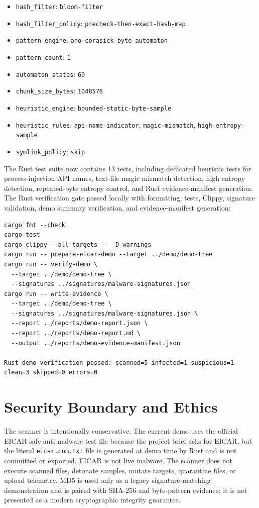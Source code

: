 \documentclass[11pt]{article}
\begin{document}
\begin{itemize}[leftmargin=*]
  \item \texttt{hash\_filter}: \texttt{bloom-filter}
  \item \texttt{hash\_filter\_policy}: \texttt{precheck-then-exact-hash-map}
  \item \texttt{pattern\_engine}: \texttt{aho-corasick-byte-automaton}
  \item \texttt{pattern\_count}: \texttt{1}
  \item \texttt{automaton\_states}: \texttt{69}
  \item \texttt{chunk\_size\_bytes}: \texttt{1048576}
  \item \texttt{heuristic\_engine}: \texttt{bounded-static-byte-sample}
  \item \texttt{heuristic\_rules}: \texttt{api-name-indicator},
        \texttt{magic-mismatch}, \texttt{high-entropy-sample}
  \item \texttt{symlink\_policy}: \texttt{skip}
\end{itemize}

The Rust test suite now contains 13 tests, including dedicated heuristic tests
for process-injection API names, text-file magic mismatch detection, high
entropy detection, repeated-byte entropy control, and Rust evidence-manifest
generation. The Rust verification gate passed locally with formatting, tests,
Clippy, signature validation, demo summary verification, and evidence-manifest
generation:

\begin{lstlisting}[style=sentinel]
cargo fmt --check
cargo test
cargo clippy --all-targets -- -D warnings
cargo run -- prepare-eicar-demo --target ../demo/demo-tree
cargo run -- verify-demo \
  --target ../demo/demo-tree \
  --signatures ../signatures/malware-signatures.json
cargo run -- write-evidence \
  --target ../demo/demo-tree \
  --signatures ../signatures/malware-signatures.json \
  --report ../reports/demo-report.json \
  --report ../reports/demo-report.md \
  --output ../reports/demo-evidence-manifest.json

Rust demo verification passed: scanned=5 infected=1 suspicious=1 clean=3 skipped=0 errors=0
\end{lstlisting}

\section{Security Boundary and Ethics}

The scanner is intentionally conservative. The current demo uses the official
EICAR safe anti-malware test file because the project brief asks for EICAR, but
the literal \texttt{eicar.com.txt} file is generated at demo time by Rust and is
not committed or exported. EICAR is not live malware. The scanner does not
execute scanned files, detonate samples, mutate targets, quarantine files, or
upload telemetry. MD5 is used only as a legacy signature-matching demonstration
and is paired with SHA-256 and byte-pattern evidence; it is not presented as a
modern cryptographic integrity guarantee.
\end{document}
